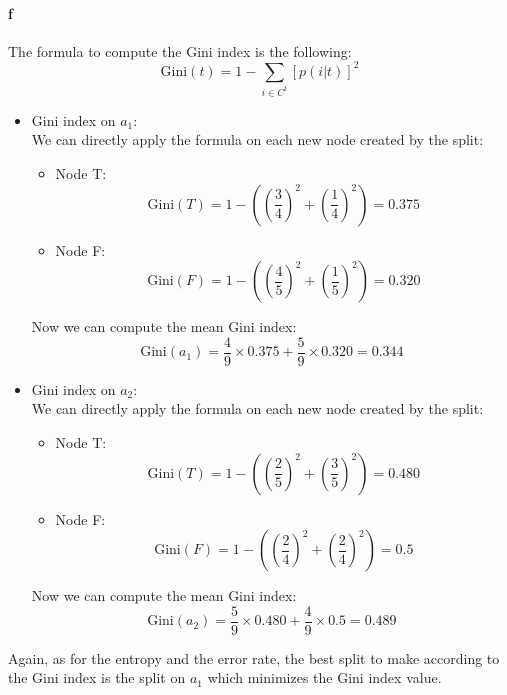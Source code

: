 \documentclass[a4paper, 10pt]{article}
\begin{document}
\paragraph{f}
The formula to compute the Gini index is the following:
$$
\text{Gini}(t) = 1 - \sum_{i\in C^t} [p(i\vert t)]^2
$$
\begin{itemize}[label=$\square$]
    \item Gini index on $a_1$:\\
    We can directly apply the formula on each new node created by the split:
    \begin{itemize}
        \item Node T:
        $$
        \text{Gini}(T) = 1 - \left(\left(\frac{3}{4}\right)^2 + \left(\frac{1}{4}\right)^2\right) = 0.375
        $$
        \item Node F:
        $$
        \text{Gini}(F) = 1 - \left(\left(\frac{4}{5}\right)^2 + \left(\frac{1}{5}\right)^2 \right) = 0.320
        $$
    \end{itemize}
    Now we can compute the mean Gini index:
    $$
    \text{Gini}(a_1) = \frac{4}{9}\times 0.375 + \frac{5}{9}\times0.320 = 0.344
    $$
    
    \item Gini index on $a_2$:\\
    We can directly apply the formula on each new node created by the split:
    \begin{itemize}
        \item Node T:
        $$
        \text{Gini}(T) = 1 - \left(\left(\frac{2}{5}\right)^2 + \left(\frac{3}{5}\right)^2\right) = 0.480
        $$
        \item Node F:
        $$
        \text{Gini}(F) = 1 - \left(\left(\frac{2}{4}\right)^2+ \left(\frac{2}{4}\right)^2\right) = 0.5
        $$
    \end{itemize}
    Now we can compute the mean Gini index:
    $$
    \text{Gini}(a_2) = \frac{5}{9}\times 0.480 + \frac{4}{9}\times0.5 = 0.489
    $$
\end{itemize}
Again, as for the entropy and the error rate, the best split to make according to the Gini index is
the split on $a_1$ which minimizes the Gini index value.
\end{document}
